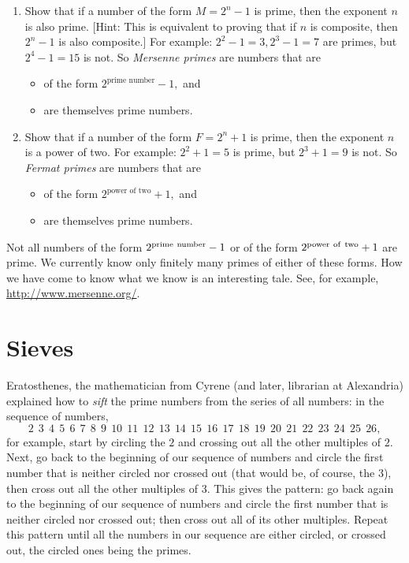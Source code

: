 \documentclass[openany]{book}
\newcommand{\ill}[3]{%
   \begin{figure}[H]%
   \vspace{-2ex}
   \centering%
   \texttt{[image: illustrations/\#1]}%
   \caption{#3}%
   \vspace{-2ex}
    \end{figure}}
\theoremstyle{plain}
\theoremstyle{definition}
\begin{document}
\begin{enumerate}
\item Show that if a number of the form $M=2^n-1$ is prime, then the
  exponent $n$ is also prime. [Hint: This is equivalent to proving
  that if $n$ is composite, then $2^n-1$ is also composite.]
  For example: $ 2^2-1= 3, 2^3-1= 7$ are
  primes, but $2^4-1=15$ is not.  So {\it Mersenne primes} are numbers
  that are
  \begin{itemize}
    \item of the form $\displaystyle 2^\text{prime number} -1,$ and
    \item are themselves prime numbers.
  \end{itemize}

\item Show that if a number of the form $F=2^n+1$ is prime, then the
  exponent $n$ is a power of two.  For example: $ 2^2+1= 5$ is prime,
  but $2^3+1= 9$ is not.  So {\it Fermat primes} are numbers that
  are
  \begin{itemize}
     \item of the form $\displaystyle 2^\text{power of two} + 1,$ and
     \item are themselves prime numbers.
  \end{itemize}
\end{enumerate}


Not all numbers of the form $2^{\rm prime\ number} -1$ or of the form
$2^{\rm power\ of\ two} +1$ are prime. We currently know only finitely
many primes of either of these forms. How we have come to know what we
know is an interesting tale.  See, for example, \url{http://www.mersenne.org/}.


\chapter{Sieves}\label{ch:sieves}

Eratosthenes, the mathematician from Cyrene (and later, librarian at
Alexandria) explained how to {\em sift} the prime numbers from the
series of all numbers: in the sequence of numbers,
$$2\ \ 3\ \ 4 \ \ 5\ \ 6\ \ 7\ \ 8\ \ 9\ \ 10\ \ 11
\ \ 12\ \ 13\ \ 14\ \ 15\ \ 16\ \ 17\ \ 18\ \ 19\ \ 20\ \ 21\ \ 22\ \ 23\ \ 24\ \ 25\ \ 26,$$
for example, start by circling the $2$ and crossing out all the other
multiples of $2$.  Next, go back to the beginning of our sequence of
numbers and circle the first number that is neither circled nor
crossed out (that would be, of course, the $3$), then cross out all
the other multiples of $3$.  This gives the pattern: go back again to
the beginning of our sequence of numbers and circle the first number
that is neither circled nor crossed out; then cross out all of its
other multiples.  Repeat this pattern until all the numbers in our
sequence are either circled, or crossed out, the circled ones being
the primes.
\end{document}

